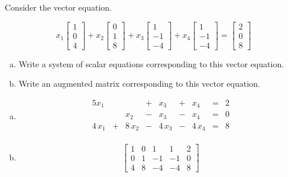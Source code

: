 
\begin{exerciseStatement}


Consider the vector equation.

\[ x_{1} \left[\begin{array}{c}
1 \\
0 \\
4
\end{array}\right] + x_{2} \left[\begin{array}{c}
0 \\
1 \\
8
\end{array}\right] + x_{3} \left[\begin{array}{c}
1 \\
-1 \\
-4
\end{array}\right] + x_{4} \left[\begin{array}{c}
1 \\
-1 \\
-4
\end{array}\right] = \left[\begin{array}{c}
2 \\
0 \\
8
\end{array}\right] \]
\begin{enumerate}[(a)]
\item  Write a system of scalar equations corresponding to this vector equation. 
\item  Write an augmented matrix corresponding to this vector equation. 
\end{enumerate}
    
\end{exerciseStatement}
    
\begin{exerciseAnswer} 

\begin{enumerate}[(a)]
\item 
\begin{alignat*}{5} x_{1} & &  &+& x_{3} &+& x_{4} &=& 2 \\ & & x_{2} &-& x_{3} &-& x_{4} &=& 0 \\4 \, x_{1} &+& 8 \, x_{2} &-& 4 \, x_{3} &-& 4 \, x_{4} &=& 8 \\ \end{alignat*}
            
\item \[ \left[\begin{array}{cccc|c}
1 & 0 & 1 & 1 & 2 \\
0 & 1 & -1 & -1 & 0 \\
4 & 8 & -4 & -4 & 8
\end{array}\right] \]
\end{enumerate}
    
\end{exerciseAnswer}
    
